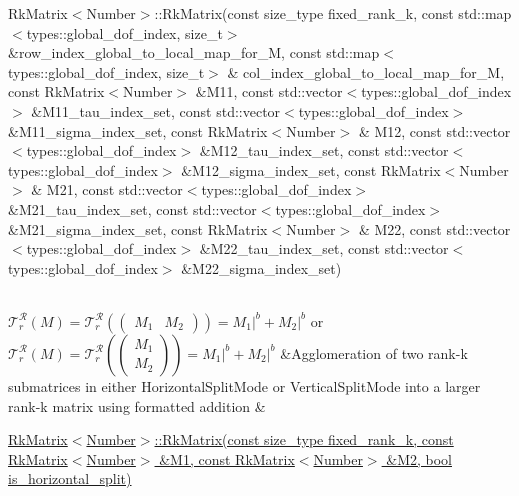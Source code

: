 \begin{longtabu}
\begin{DoxyItemize}
\item Rk\+Matrix$<$\+Number$>$\+::\+Rk\+Matrix(const size\+\_\+type fixed\+\_\+rank\+\_\+k, const std\+::map$<$types\+::global\+\_\+dof\+\_\+index, size\+\_\+t$>$ \&row\+\_\+index\+\_\+global\+\_\+to\+\_\+local\+\_\+map\+\_\+for\+\_\+\+M, const std\+::map$<$types\+::global\+\_\+dof\+\_\+index, size\+\_\+t$>$ \& col\+\_\+index\+\_\+global\+\_\+to\+\_\+local\+\_\+map\+\_\+for\+\_\+\+M, const Rk\+Matrix$<$\+Number$>$ \&\+M11, const std\+::vector$<$types\+::global\+\_\+dof\+\_\+index$>$ \&\+M11\+\_\+tau\+\_\+index\+\_\+set, const std\+::vector$<$types\+::global\+\_\+dof\+\_\+index$>$ \&\+M11\+\_\+sigma\+\_\+index\+\_\+set, const Rk\+Matrix$<$\+Number$>$ \& M12, const std\+::vector$<$types\+::global\+\_\+dof\+\_\+index$>$ \&\+M12\+\_\+tau\+\_\+index\+\_\+set, const std\+::vector$<$types\+::global\+\_\+dof\+\_\+index$>$ \&\+M12\+\_\+sigma\+\_\+index\+\_\+set, const Rk\+Matrix$<$\+Number$>$ \& M21, const std\+::vector$<$types\+::global\+\_\+dof\+\_\+index$>$ \&\+M21\+\_\+tau\+\_\+index\+\_\+set, const std\+::vector$<$types\+::global\+\_\+dof\+\_\+index$>$ \&\+M21\+\_\+sigma\+\_\+index\+\_\+set, const Rk\+Matrix$<$\+Number$>$ \& M22, const std\+::vector$<$types\+::global\+\_\+dof\+\_\+index$>$ \&\+M22\+\_\+tau\+\_\+index\+\_\+set, const std\+::vector$<$types\+::global\+\_\+dof\+\_\+index$>$ \&\+M22\+\_\+sigma\+\_\+index\+\_\+set)
\end{DoxyItemize}\\
$\mathcal{T}_r^{\mathcal{R}}(M) = \mathcal{T}_r^{\mathcal{R}}\left(\begin{pmatrix} M_1 & M_2 \end{pmatrix}\right) = M_1 \vert^b + M_2 \vert^b$ or $\mathcal{T}_r^{\mathcal{R}}(M) = \mathcal{T}_r^{\mathcal{R}}\left(\begin{pmatrix} M_1 \\ M_2 \end{pmatrix}\right) = M_1 \vert^b + M_2 \vert^b$ &Agglomeration of two rank-\/k submatrices in either {\ttfamily Horizontal\+Split\+Mode} or {\ttfamily Vertical\+Split\+Mode} into a larger rank-\/k matrix using formatted addition &
\begin{DoxyItemize}
\item \hyperlink{classRkMatrix_ae15a15d55d04dd677a8dc90dbf789674}{Rk\+Matrix$<$\+Number$>$\+::\+Rk\+Matrix(const size\+\_\+type fixed\+\_\+rank\+\_\+k, const Rk\+Matrix$<$\+Number$>$ \&\+M1, const Rk\+Matrix$<$\+Number$>$ \&\+M2, bool is\+\_\+horizontal\+\_\+split)}

\end{DoxyItemize}
\end{longtabu}
